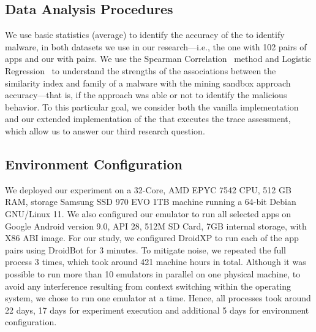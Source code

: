\subsection{Data Analysis Procedures} \label{sec:dataAnalysisProc}

We use basic statistics (average) to identify the
accuracy of the \mas to identify malware, in both
datasets we use in our research---i.e., the \sds
one with 102 pairs of apps and our \cds with
\apps pairs. We use the Spearman Correlation~\cite{spearman-correlation} method and
Logistic Regression~\cite{statistical-learning} to understand the strengths of
the associations between the similarity index and family of a
malware with the mining sandbox approach accuracy---that is,
if the approach was able or not to identify the malicious behavior.
To this particular goal, we consider
both the vanilla implementation and our extended implementation
of the \mas that executes the trace assessment, which allow us
to answer our third research question. 


\subsection{Environment Configuration}\label{sec:hardware}


We deployed our experiment on a 32-Core, AMD EPYC 7542 CPU, 512 GB RAM, storage Samsung SSD 970 EVO 1TB machine running a 64-bit Debian  GNU/Linux 11. We also configured our emulator to run all selected apps on Google Android version 9.0, API 28, 512M SD Card, 7GB internal storage, with X86 ABI image.
For our study, we configured DroidXP to run each of the \apps app pairs using DroidBot for 3 minutes. To mitigate noise, we repeated the full process 3 times,  which took around 421 machine hours in total. Although it was possible to run more than 10 emulators in parallel on one physical machine, to avoid any interference resulting from context switching within the operating system, we chose to run one emulator at a time.  Hence, all processes took around 22 days, 17 days for experiment execution and additional 5 days for environment configuration.

